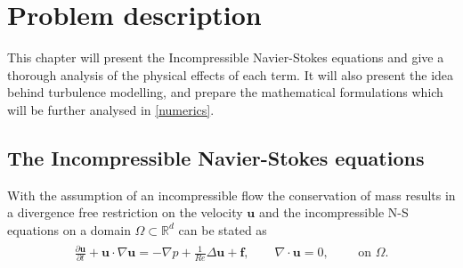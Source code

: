 
\chapter{Problem description} %

\label{description} %


This chapter will present the Incompressible Navier-Stokes equations and give a thorough 
analysis of the physical effects of each term. It will also present the idea behind turbulence 
modelling, and prepare the mathematical formulations which will be further analysed in \cref{numerics}.

\section{The Incompressible Navier-Stokes equations}

With the assumption of an incompressible flow the conservation of mass 
results in a divergence free restriction on the velocity $\mathbf{u}$
and the incompressible N-S equations on a domain $\Omega\subset\mathbb{R}^d$ can be stated as  
%
\begin{align}
    \begin{split}
    \frac{\partial \mathbf{u}}{\partial t} + \mathbf{u}\cdot \nabla\mathbf{u} = 
    -\nabla p + \frac{1}{Re} \Delta\mathbf{u} + \mathbf{f}, \qquad 
    \nabla \cdot \mathbf{u} = 0, \qquad \text{ on } \Omega.
    \end{split}
    \label{eq:NS}
\end{align}
%

